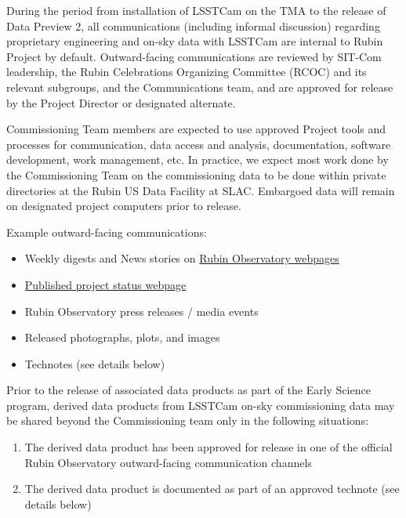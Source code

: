 \documentclass[SE,authoryear,toc,lsstdraft]{lsstdoc}
\begin{document}
During the period from installation of LSSTCam on the TMA to the release of Data Preview 2, all communications (including informal discussion) regarding proprietary engineering and on-sky data with LSSTCam are internal to Rubin Project by default.
Outward-facing communications are reviewed by SIT-Com leadership, the Rubin Celebrations Organizing Committee (RCOC) and its relevant subgroups, and the Communications team, and are approved for release by the Project Director or designated alternate.

Commissioning Team members are expected to use approved Project tools and processes
for communication, data access and analysis, documentation, software development, work
management, etc.
In practice, we expect most work done by the Commissioning Team on
the commissioning data to be done within private directories at the Rubin US Data Facility at SLAC.
Embargoed data will remain on designated project computers prior to release.

Example outward-facing communications:

\begin{itemize}

  \item Weekly digests and News stories on \href{https://rubinobservatory.org/}{Rubin Observatory webpages}

  \item \href{https://www.lsst.org/about/project-status}{Published project status webpage}

  \item Rubin Observatory press releases / media events

  \item Released photographs, plots, and images

  \item Technotes (see details below)

\end{itemize}

Prior to the release of associated data products as part of the Early Science program, derived data products from LSSTCam on-sky commissioning data may be shared beyond the Commissioning team only in the following situations:

\begin{enumerate}

  \item The derived data product has been approved for release in one of the official Rubin Observatory outward-facing communication channels

  \item The derived data product is documented as part of an approved technote (see details below)

\end{enumerate}
\end{document}

